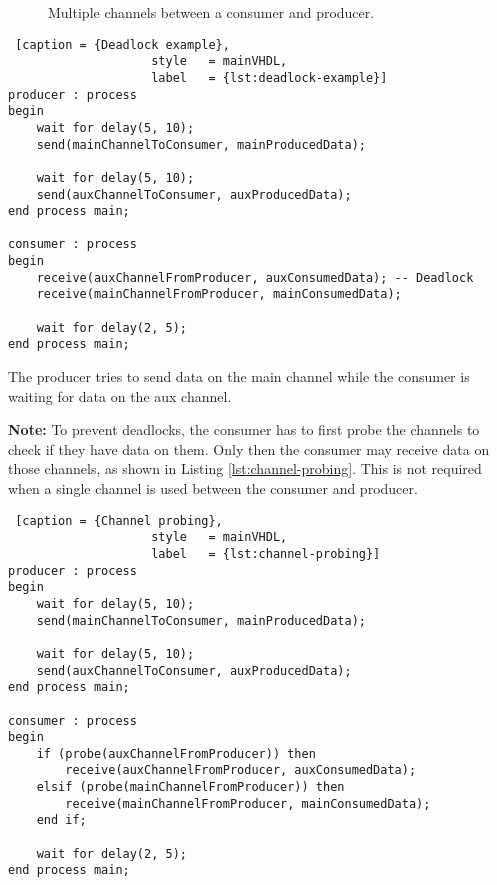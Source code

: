 \documentclass{report}
\begin{document}
\begin {figure}[H]
\centering
{}
\caption {Multiple channels between a consumer and producer.}
\label {fig:multiple-channels}
\end {figure}

\begin{lstlisting} [caption = {Deadlock example},
                    style   = mainVHDL,
                    label   = {lst:deadlock-example}]
producer : process
begin
    wait for delay(5, 10);
    send(mainChannelToConsumer, mainProducedData);

    wait for delay(5, 10);
    send(auxChannelToConsumer, auxProducedData);
end process main;

consumer : process
begin
    receive(auxChannelFromProducer, auxConsumedData); -- Deadlock
    receive(mainChannelFromProducer, mainConsumedData);

    wait for delay(2, 5);
end process main;
\end{lstlisting}

The producer tries to send data on the main channel while the consumer is
waiting for data on the aux channel.

\textbf{Note:} To prevent deadlocks, the consumer has to first probe the
channels to check if they have data on them. Only then the consumer may receive
data on those channels, as shown in Listing \ref{lst:channel-probing}. This is
not required when a single channel is used between the consumer and producer.

\begin{lstlisting} [caption = {Channel probing},
                    style   = mainVHDL,
                    label   = {lst:channel-probing}]
producer : process
begin
    wait for delay(5, 10);
    send(mainChannelToConsumer, mainProducedData);

    wait for delay(5, 10);
    send(auxChannelToConsumer, auxProducedData);
end process main;

consumer : process
begin
    if (probe(auxChannelFromProducer)) then
        receive(auxChannelFromProducer, auxConsumedData);
    elsif (probe(mainChannelFromProducer)) then
        receive(mainChannelFromProducer, mainConsumedData);
    end if;

    wait for delay(2, 5);
end process main;
\end{lstlisting}
\end{document}
